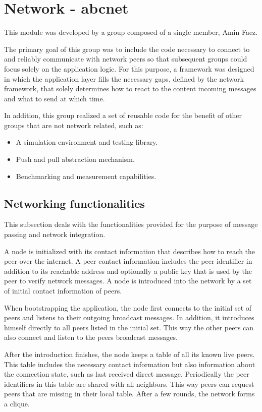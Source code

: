 \section{Network - abcnet}

This module was developed by a group composed of a single member, Amin Faez.  

The primary goal of this group was to include the code necessary to connect to and reliably communicate with network peers so that subsequent groups could focus solely on the application logic. 
For this purpose, a framework was designed in which the application layer fills the necessary gaps, defined by the network framework, that solely determines how to react to the content incoming messages and what to send at which time.

In addition, this group realized a set of reusable code for the benefit of other groups that are not network related, such as:

\begin{itemize}
    \item A simulation environment and testing library.
    \item Push and pull abstraction mechanism.
    \item Benchmarking and measurement capabilities.
\end{itemize}

\subsection{Networking functionalities}

This subsection deals with the functionalities provided for the purpose of message passing and network integration.

A node is initialized with its contact information that describes how to reach the peer over the internet.
A peer contact information includes the peer identifier in addition to its reachable address and optionally a public key that is used by the peer to verify network messages.
A node is introduced into the network by a set of initial contact information of peers.

When bootstrapping the application, the node first connects to the initial set of peers and listens to their outgoing broadcast messages. In addition, it introduces himself directly to all peers listed in the initial set. This way the other peers can also connect and listen to the peers broadcast messages.

After the introduction finishes, the node keeps a table of all its known live peers. This table includes the necessary contact information but also information about the connection state, such as last received direct message. Periodically the peer identifiers in this table are shared with all neighbors. This way peers can request peers that are missing in their local table. After a few rounds, the network forms a clique. 

